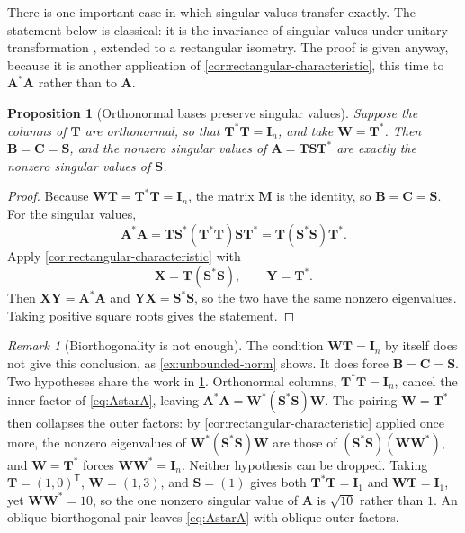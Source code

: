 \documentclass[11pt]{article}
\newcommand{\I}{\mathbf{I}}
\newcommand{\mat}[1]{\mathbf{#1}}
\newtheorem{proposition}[proposition]{Proposition}
\theoremstyle{definition}
\theoremstyle{remark}
\newtheorem{remark}[remark]{Remark}
\begin{document}
There is one important case in which singular values transfer exactly. The statement below is classical: it is the invariance of singular values under unitary transformation \parencite[Section~2.6]{horn2013matrix}, extended to a rectangular isometry. The proof is given anyway, because it is another application of \cref{cor:rectangular-characteristic}, this time to \(\mat{A}^{*}\mat{A}\) rather than to \(\mat{A}\).

\begin{proposition}[Orthonormal bases preserve singular values]
\label{prop:orthonormal-singular-values}
Suppose the columns of \(\mat{T}\) are orthonormal, so that \(\mat{T}^{*}\mat{T}=\I_n\), and take \(\mat{W}=\mat{T}^{*}\). Then \(\mat{B}=\mat{C}=\mat{S}\), and the nonzero singular values of \(\mat{A}=\mat{T}\mat{S}\mat{T}^{*}\) are exactly the nonzero singular values of \(\mat{S}\).
\end{proposition}

\begin{proof}
Because \(\mat{W}\mat{T}=\mat{T}^{*}\mat{T}=\I_n\), the matrix \(\mat{M}\) is the identity, so \(\mat{B}=\mat{C}=\mat{S}\). For the singular values,
\[
  \mat{A}^{*}\mat{A}
  =\mat{T}\mat{S}^{*}(\mat{T}^{*}\mat{T})\mat{S}\mat{T}^{*}
  =\mat{T}(\mat{S}^{*}\mat{S})\mat{T}^{*}.
\]
Apply \cref{cor:rectangular-characteristic} with
\[
  \mat{X}=\mat{T}(\mat{S}^{*}\mat{S}),
  \qquad
  \mat{Y}=\mat{T}^{*}.
\]
Then \(\mat{X}\mat{Y}=\mat{A}^{*}\mat{A}\) and
\(\mat{Y}\mat{X}=\mat{S}^{*}\mat{S}\), so the two have the same nonzero eigenvalues. Taking positive square roots gives the statement.
\end{proof}

\begin{remark}[Biorthogonality is not enough]
The condition \(\mat{W}\mat{T}=\I_n\) by itself does not give this conclusion, as \cref{ex:unbounded-norm} shows. It does force \(\mat{B}=\mat{C}=\mat{S}\). Two hypotheses share the work in \cref{prop:orthonormal-singular-values}. Orthonormal columns, \(\mat{T}^{*}\mat{T}=\I_n\), cancel the inner factor of \cref{eq:AstarA}, leaving \(\mat{A}^{*}\mat{A}=\mat{W}^{*}(\mat{S}^{*}\mat{S})\mat{W}\). The pairing \(\mat{W}=\mat{T}^{*}\) then collapses the outer factors: by \cref{cor:rectangular-characteristic} applied once more, the nonzero eigenvalues of \(\mat{W}^{*}(\mat{S}^{*}\mat{S})\mat{W}\) are those of \((\mat{S}^{*}\mat{S})(\mat{W}\mat{W}^{*})\), and \(\mat{W}=\mat{T}^{*}\) forces \(\mat{W}\mat{W}^{*}=\I_n\). Neither hypothesis can be dropped. Taking \(\mat{T}=(1,0)^{\mathsf T}\), \(\mat{W}=(1,3)\), and \(\mat{S}=(1)\) gives both \(\mat{T}^{*}\mat{T}=\I_1\) and \(\mat{W}\mat{T}=\I_1\), yet \(\mat{W}\mat{W}^{*}=10\), so the one nonzero singular value of \(\mat{A}\) is \(\sqrt{10}\) rather than \(1\). An oblique biorthogonal pair leaves \cref{eq:AstarA} with oblique outer factors.
\end{remark}
\end{document}
